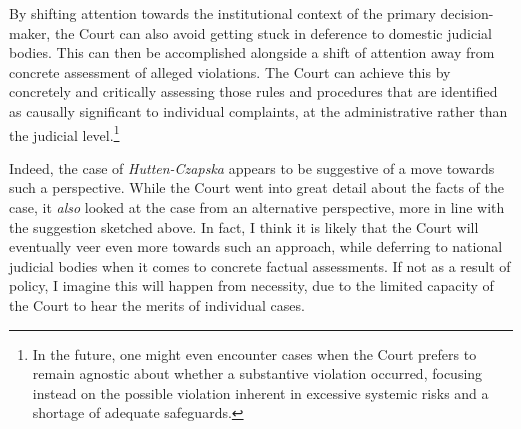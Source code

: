 By shifting attention towards the institutional context of the primary decision-maker, the Court can also avoid getting stuck in deference to domestic judicial bodies. This can then be accomplished alongside a shift of attention away from concrete assessment of alleged violations. The Court can achieve this by concretely and critically assessing those rules and procedures that are identified as causally significant to individual complaints, at the administrative rather than the judicial level.\footnote{In the future, one might even encounter cases when the Court prefers to remain agnostic about whether a substantive violation occurred, focusing instead on the possible violation inherent in excessive systemic risks and a shortage of adequate safeguards.}

Indeed, the case of {\it Hutten-Czapska} appears to be suggestive of a move towards such a perspective. While the Court went into great detail about the facts of the case, it {\it also} looked at the case from an alternative perspective, more in line with the suggestion sketched above. In fact, I think it is likely that the Court will eventually veer even more towards such an approach, while deferring to national judicial bodies when it comes to concrete factual assessments. If not as a result of policy, I imagine this will happen from necessity, due to the limited capacity of the Court to hear the merits of individual cases.

